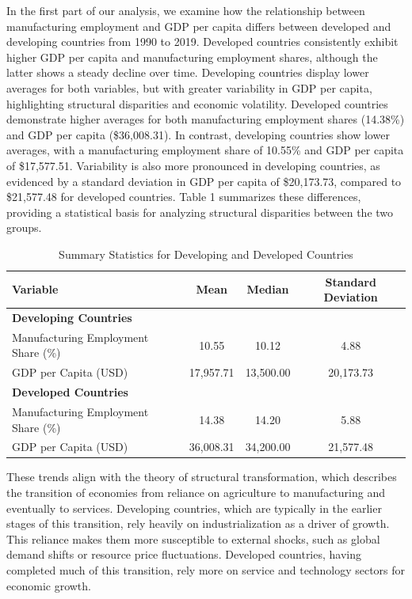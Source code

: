 \documentclass[12pt]{article}
\begin{document}
    In the first part of our analysis, we examine how the relationship between manufacturing employment and GDP per capita differs between developed and developing countries from 1990 to 2019. Developed countries consistently exhibit higher GDP per capita and manufacturing employment shares, although the latter shows a steady decline over time. Developing countries display lower averages for both variables, but with greater variability in GDP per capita, highlighting structural disparities and economic volatility.
    Developed countries demonstrate higher averages for both manufacturing employment shares (14.38\%) and GDP per capita (\$36,008.31). In contrast, developing countries show lower averages, with a manufacturing employment share of 10.55\% and GDP per capita of \$17,577.51. Variability is also more pronounced in developing countries, as evidenced by a standard deviation in GDP per capita of \$20,173.73, compared to \$21,577.48 for developed countries. Table 1 summarizes these differences, providing a statistical basis for analyzing structural disparities between the two groups.
\begin{table}[h!]
\centering
\caption{Summary Statistics for Developing and Developed Countries}
\begin{tabular}{|l|c|c|c|}
\hline
\textbf{Variable} & \textbf{Mean} & \textbf{Median} & \textbf{Standard Deviation} \\ \hline
\multicolumn{4}{|l|}{\textbf{Developing Countries}} \\ \hline
Manufacturing Employment Share (\%) & 10.55 & 10.12 & 4.88 \\ \hline
GDP per Capita (USD) & 17,957.71 & 13,500.00 & 20,173.73 \\ \hline
\multicolumn{4}{|l|}{\textbf{Developed Countries}} \\ \hline
Manufacturing Employment Share (\%) & 14.38 & 14.20 & 5.88 \\ \hline
GDP per Capita (USD) & 36,008.31 & 34,200.00 & 21,577.48 \\ \hline
\end{tabular}
\label{table 1}
\end{table}
    These trends align with the theory of structural transformation, which describes the transition of economies from reliance on agriculture to manufacturing and eventually to services. Developing countries, which are typically in the earlier stages of this transition, rely heavily on industrialization as a driver of growth. This reliance makes them more susceptible to external shocks, such as global demand shifts or resource price fluctuations. Developed countries, having completed much of this transition, rely more on service and technology sectors for economic growth.
\end{document}
